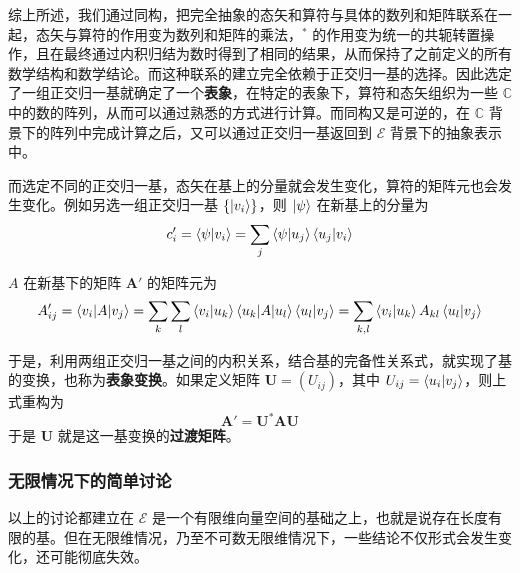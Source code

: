 \documentclass[cn,10pt,math=newtx,citestyle=gb7714-2015,bibstyle=gb7714-2015]{elegantbook}
\def\mbf{\mathbf}
\def\ms{\mathscr}
\def\C{\mathbb C}
\begin{document}
综上所述，我们通过同构，把完全抽象的态矢和算符与具体的数列和矩阵联系在一起，态矢与算符的作用变为数列和矩阵的乘法，$^*$ 的作用变为统一的共轭转置操作，且在最终通过内积归结为数时得到了相同的结果，从而保持了之前定义的所有数学结构和数学结论。而这种联系的建立完全依赖于正交归一基的选择。因此选定了一组正交归一基就确定了一个\textbf{表象}，在特定的表象下，算符和态矢组织为一些 $\C$ 中的数的阵列，从而可以通过熟悉的方式进行计算。而同构又是可逆的，在 $\C$ 背景下的阵列中完成计算之后，又可以通过正交归一基返回到 $\ms E$ 背景下的抽象表示中。

而选定不同的正交归一基，态矢在基上的分量就会发生变化，算符的矩阵元也会发生变化。例如另选一组正交归一基 $\{\ket{v_i}\}$，则 $\ket{\psi}$ 在新基上的分量为
\begin{equation}
   c_i'=\braket{\psi|v_i} = \sum_j\braket{\psi|u_j}\braket{u_j|v_i}
\end{equation}

$A$ 在新基下的矩阵 $\mbf A'$ 的矩阵元为
\begin{equation}
   A_{ij}'=\braket{v_i|A|v_j} = \sum_k\sum_l\braket{v_i|u_k}\braket{u_k|A|u_l}\braket{u_l|v_j}=\sum_{k,l}\braket{v_i|u_k}A_{kl}\braket{u_l|v_j}
\end{equation}

于是，利用两组正交归一基之间的内积关系，结合基的完备性关系式，就实现了基的变换，也称为\textbf{表象变换}。如果定义矩阵 $\mbf U = (U_{ij})$，其中 $U_{ij} = \braket{u_i|v_j}$，则上式重构为
\begin{equation}
    \mbf A' = \mbf U^*\mbf A\mbf U
\end{equation}
于是 $\mbf U$ 就是这一基变换的\textbf{过渡矩阵}。

\subsubsection{无限情况下的简单讨论}
以上的讨论都建立在 $\ms E$ 是一个有限维向量空间的基础之上，也就是说存在长度有限的基。但在无限维情况，乃至不可数无限维情况下，一些结论不仅形式会发生变化，还可能彻底失效。
\end{document}
